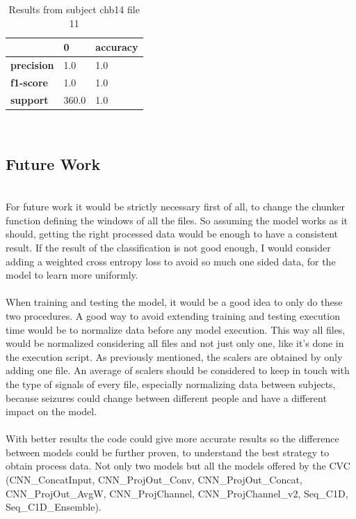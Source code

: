 \begin{table}[H]
    \centering
    \caption{Results from subject chb14 file 11}
    \begin{tabular}{|l|l|l|}
        \hline
                        & \textbf{0} & \textbf{accuracy} \\ \hline
        \textbf{precision} & 1.0        & 1.0               \\ \hline
        \textbf{f1-score}  & 1.0        & 1.0               \\ \hline
        \textbf{support}   & 360.0      & 1.0               \\ \hline
    \end{tabular}
\end{table}
\leavevmode\\

\subsection{Future Work}
\leavevmode\\
For future work it would be strictly necessary first of all, to change the chunker function defining the windows of all the files. So assuming the model works as it should, getting the right processed data would be enough to have a consistent result. If the result of the classification is not good enough, I would consider adding a weighted cross entropy loss to avoid so much one sided data, for the model to learn more uniformly.
\\\\
When training and testing the model, it would be a good idea to only do these two procedures. A good way to avoid extending training and testing execution time would be to normalize data before any model execution. This way all files, would be normalized considering all files and not just only one, like it’s done in the execution script. As previously mentioned, the scalers are obtained by only adding one file. An average of scalers should be considered to keep in touch with the type of signals of every file, especially normalizing data between subjects, because seizures could change between different people and have a different impact on the model.
\\\\
With better results the code could give more accurate results so the difference between models could be further proven, to understand the best strategy to obtain process data. Not only two models but all the models offered by the CVC (CNN\_ConcatInput, CNN\_ProjOut\_Conv, CNN\_ProjOut\_Concat, CNN\_ProjOut\_AvgW, CNN\_ProjChannel, CNN\_ProjChannel\_v2, Seq\_C1D, Seq\_C1D\_Ensemble).
